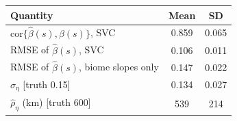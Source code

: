 \begin{tabular}{@{}lcc@{}}
\toprule
Quantity & Mean & SD \\
\midrule
$\mathrm{cor}\{\hat\beta(s), \beta(s)\}$, SVC & 0.859 & 0.065 \\
RMSE of $\hat\beta(s)$, SVC & 0.106 & 0.011 \\
RMSE of $\hat\beta(s)$, biome slopes only & 0.147 & 0.022 \\
$\hat\sigma_\eta$ [truth 0.15] & 0.134 & 0.027 \\
$\hat\rho_\eta$ (km) [truth 600] & 539 & 214 \\
\bottomrule
\end{tabular}

